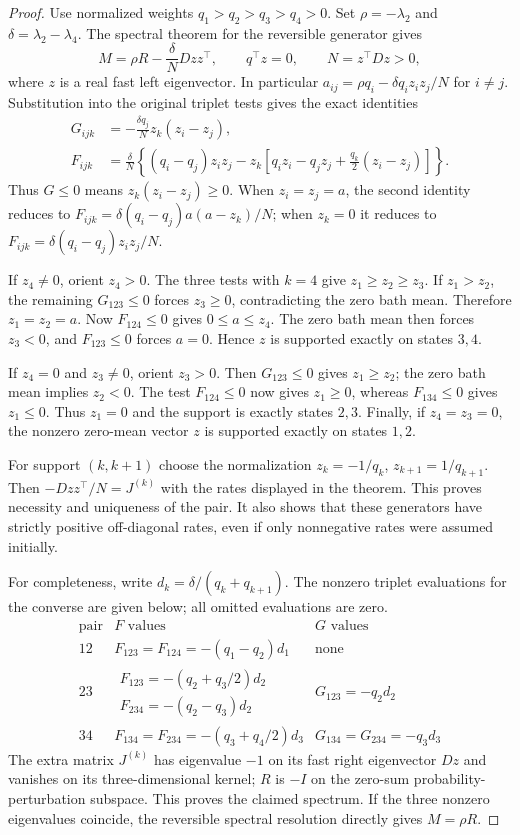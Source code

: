 \begin{proof}
Use normalized weights $q_1>q_2>q_3>q_4>0$.
Set $\rho=-\lambda_2$ and $\delta=\lambda_2-\lambda_4$.
The spectral theorem for the reversible generator gives
\[
M=\rho R-\frac{\delta}{N}Dzz^\top,
\qquad q^\top z=0,\qquad N=z^\top Dz>0,
\]
where $z$ is a real fast left eigenvector. In particular
$a_{ij}=\rho q_i-\delta q_i z_i z_j/N$ for $i\ne j$.
Substitution into the original triplet tests gives the exact identities
\begin{align*}
G_{ijk}&=-\frac{\delta q_j}{N}z_k(z_i-z_j),\\
F_{ijk}&=\frac{\delta}{N}\left\{
(q_i-q_j)z_i z_j-z_k\left[q_i z_i-q_j z_j
 +\frac{q_k}{2}(z_i-z_j)\right]\right\}.
\end{align*}
Thus $G\leq0$ means $z_k(z_i-z_j)\geq0$.
When $z_i=z_j=a$, the second identity reduces to
$F_{ijk}=\delta(q_i-q_j)a(a-z_k)/N$; when $z_k=0$ it reduces to
$F_{ijk}=\delta(q_i-q_j)z_i z_j/N$.

If $z_4\ne0$, orient $z_4>0$. The three tests with $k=4$
give $z_1\geq z_2\geq z_3$. If $z_1>z_2$, the remaining
$G_{123}\leq0$ forces $z_3\geq0$, contradicting the zero bath
mean. Therefore $z_1=z_2=a$.
Now $F_{124}\leq0$ gives $0\leq a\leq z_4$.
The zero bath mean then forces $z_3<0$, and $F_{123}\leq0$
forces $a=0$. Hence $z$ is supported exactly on states $3,4$.

If $z_4=0$ and $z_3\ne0$, orient $z_3>0$.
Then $G_{123}\leq0$ gives $z_1\geq z_2$; the zero bath mean
implies $z_2<0$. The test $F_{124}\leq0$ now gives $z_1\geq0$,
whereas $F_{134}\leq0$ gives $z_1\leq0$.
Thus $z_1=0$ and the support is exactly states $2,3$.
Finally, if $z_4=z_3=0$, the nonzero zero-mean vector $z$ is
supported exactly on states $1,2$.

For support $(k,k+1)$ choose the normalization
$z_k=-1/q_k$, $z_{k+1}=1/q_{k+1}$.
Then $-Dzz^\top/N=J^{(k)}$ with the rates displayed in the theorem.
This proves necessity and uniqueness of the pair. It also shows that
these generators have strictly positive off-diagonal rates, even if
only nonnegative rates were assumed initially.

For completeness, write $d_k=\delta/(q_k+q_{k+1})$. The nonzero
triplet evaluations for the converse are given below; all omitted
evaluations are zero.
\[
\begin{array}{c|c|c}
\text{pair}&F\text{ values}&G\text{ values}\\ \hline
12&F_{123}=F_{124}=-(q_1-q_2)d_1&\text{none}\\[2pt]
23&\begin{gathered}F_{123}=-(q_2+q_3/2)d_2\\
F_{234}=-(q_2-q_3)d_2\end{gathered}&G_{123}=-q_2d_2\\[2pt]
34&F_{134}=F_{234}=-(q_3+q_4/2)d_3&G_{134}=G_{234}=-q_3d_3
\end{array}
\]
The extra matrix $J^{(k)}$ has eigenvalue $-1$ on its fast
right eigenvector $Dz$ and vanishes on its three-dimensional kernel; $R$ is
$-I$ on the zero-sum probability-perturbation subspace. This proves the claimed spectrum.
If the three nonzero eigenvalues coincide, the reversible spectral
resolution directly gives $M=\rho R$.


\end{proof}
